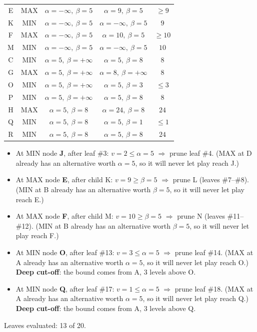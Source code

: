 \documentclass[11pt,a4paper]{article}
\begin{document}
\begin{solbox}
\begin{center}
\begin{tabular}{c c c c c}
E & MAX & $\alpha=-\infty,\ \beta=5$ & $\alpha=9,\ \beta=5$ & $\ge 9$ \\
K & MIN & $\alpha=-\infty,\ \beta=5$ & $\alpha=-\infty,\ \beta=5$ & $9$ \\
F & MAX & $\alpha=-\infty,\ \beta=5$ & $\alpha=10,\ \beta=5$ & $\ge 10$ \\
M & MIN & $\alpha=-\infty,\ \beta=5$ & $\alpha=-\infty,\ \beta=5$ & $10$ \\
C & MIN & $\alpha=5,\ \beta=+\infty$ & $\alpha=5,\ \beta=8$ & $8$ \\
G & MAX & $\alpha=5,\ \beta=+\infty$ & $\alpha=8,\ \beta=+\infty$ & $8$ \\
O & MIN & $\alpha=5,\ \beta=+\infty$ & $\alpha=5,\ \beta=3$ & $\le 3$ \\
P & MIN & $\alpha=5,\ \beta=+\infty$ & $\alpha=5,\ \beta=8$ & $8$ \\
H & MAX & $\alpha=5,\ \beta=8$ & $\alpha=24,\ \beta=8$ & $24$ \\
Q & MIN & $\alpha=5,\ \beta=8$ & $\alpha=5,\ \beta=1$ & $\le 1$ \\
R & MIN & $\alpha=5,\ \beta=8$ & $\alpha=5,\ \beta=8$ & $24$ \\\bottomrule\end{tabular}\end{center}\begin{itemize}[leftmargin=1.5em,itemsep=1pt]
\item At MIN node \textbf{J}, after leaf \#3: $v=2 \le \alpha=5$ $\Rightarrow$ prune leaf \#4. (MAX at D already has an alternative worth $\alpha=5$, so it will never let play reach J.)
\item At MAX node \textbf{E}, after child K: $v=9 \ge \beta=5$ $\Rightarrow$ prune L (leaves \#7--\#8). (MIN at B already has an alternative worth $\beta=5$, so it will never let play reach E.)
\item At MAX node \textbf{F}, after child M: $v=10 \ge \beta=5$ $\Rightarrow$ prune N (leaves \#11--\#12). (MIN at B already has an alternative worth $\beta=5$, so it will never let play reach F.)
\item At MIN node \textbf{O}, after leaf \#13: $v=3 \le \alpha=5$ $\Rightarrow$ prune leaf \#14. (MAX at A already has an alternative worth $\alpha=5$, so it will never let play reach O.) \textbf{Deep cut-off}: the bound comes from A, 3 levels above O.
\item At MIN node \textbf{Q}, after leaf \#17: $v=1 \le \alpha=5$ $\Rightarrow$ prune leaf \#18. (MAX at A already has an alternative worth $\alpha=5$, so it will never let play reach Q.) \textbf{Deep cut-off}: the bound comes from A, 3 levels above Q.
\end{itemize}Leaves evaluated: 13 of 20.
\end{solbox}
\end{document}
